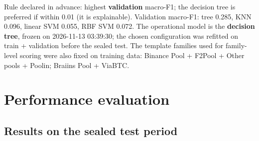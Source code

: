 \documentclass[
  11pt,
  a4paper,
]{article}
\begin{document}
Rule declared in advance: highest \textbf{validation} macro-F1; the
decision tree is preferred if within 0.01 (it is explainable).
Validation macro-F1: tree 0.285, KNN 0.096, linear SVM 0.055, RBF SVM
0.072. The operational model is the \textbf{decision tree}, frozen on
2026-11-13 03:39:30; the chosen configuration was refitted on train +
validation before the sealed test. The template families used for
family-level scoring were also fixed on training data: Binance Pool +
F2Pool + Other pools + Poolin; Braiins Pool + ViaBTC.


\section{Performance evaluation}\label{performance-evaluation}

\subsection{Results on the sealed test
period}\label{results-on-the-sealed-test-period}
\end{document}
